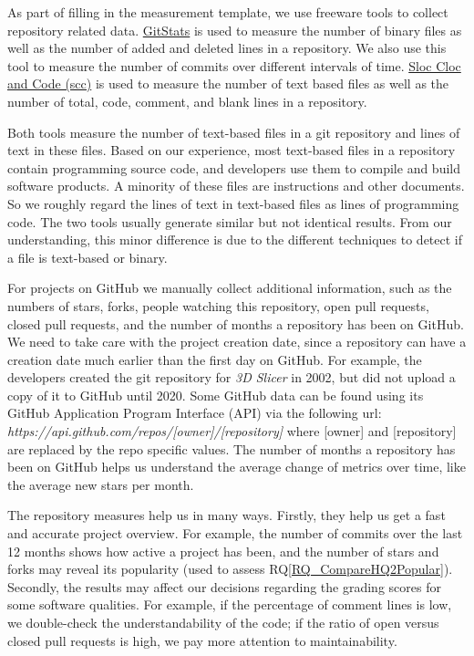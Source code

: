 \documentclass[11pt]{article}
\newcommand{\rqref}[1]{RQ\ref{#1}}
\begin{document}
As part of filling in the measurement template, we use freeware tools to collect
repository related data. \href{https://github.com/tomgi/git_stats}{GitStats}
\citep{Gieniusz2019} is used to measure the number of binary files as well as
the number of added and deleted lines in a repository. We also use this tool to
measure the number of commits over different intervals of time.
\href{https://github.com/boyter/scc}{Sloc Cloc and Code (scc)}
\citep{Boyter2021} is used to measure the number of text based files as well as
the number of total, code, comment, and blank lines in a repository.

Both tools measure the number of text-based files in a git repository and lines
of text in these files. Based on our experience, most text-based files in a
repository contain programming source code, and developers use them to compile
and build software products. A minority of these files are instructions and
other documents. So we roughly regard the lines of text in text-based files as
lines of programming code. The two tools usually generate similar but not
identical results. From our understanding, this minor difference is due to the
different techniques to detect if a file is text-based or binary.

For projects on GitHub we manually collect additional information, such as the
numbers of stars, forks, people watching this repository, open pull requests,
closed pull requests, and the number of months a repository has been on GitHub.
We need to take care with the project creation date, since a repository can have
a creation date much earlier than the first day on GitHub.  For example, the
developers created the git repository for \textit{3D Slicer} in 2002, but did
not upload a copy of it to GitHub until 2020. Some GitHub data can be found
using its GitHub Application Program Interface (API) via the following url:
\textit{https://api.github.com/repos/[owner]/[repository]} where [owner] and
[repository] are replaced by the repo specific values. The number of months a
repository has been on GitHub helps us understand the average change of metrics
over time, like the average new stars per month. 

The repository measures help us in many ways. Firstly, they help us get a fast
and accurate project overview. For example, the number of commits over the last
12 months shows how active a project has been, and the number of stars and forks
may reveal its popularity (used to assess \rqref{RQ_CompareHQ2Popular}).
Secondly, the results may affect our decisions regarding the grading scores for
some software qualities. For example, if the percentage of comment lines is low,
we double-check the understandability of the code; if the ratio of open versus
closed pull requests is high, we pay more attention to maintainability.
\end{document}
